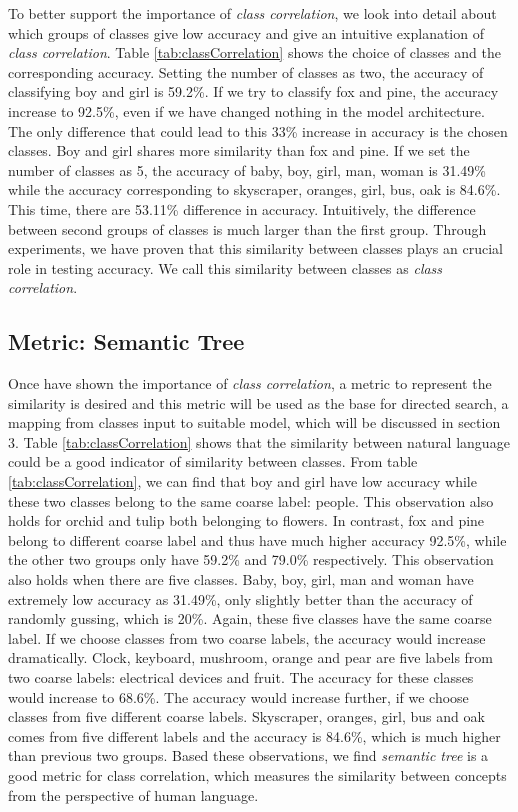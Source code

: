 \documentclass[conference]{IEEEtran}
\begin{document}
\begin{spacing}{0.9}
To better support the importance of \textit{class correlation}, we look into detail about which groups of classes give low accuracy and give an intuitive explanation of \textit{class correlation}. Table \ref{tab:classCorrelation} shows the choice of classes and the corresponding accuracy. Setting the number of classes as two, the accuracy of classifying boy and girl is 59.2\%. If we try to classify fox and pine, the accuracy increase to 92.5\%, even if we have changed nothing in the model architecture. The only difference that could lead to this 33\% increase in accuracy is the chosen classes. Boy and girl shares more similarity than fox and pine. If we set the number of classes as 5, the accuracy of baby, boy, girl, man, woman is 31.49\% while the accuracy corresponding to skyscraper, oranges, girl, bus, oak is 84.6\%. This time, there are 53.11\% difference in accuracy. Intuitively, the difference between second groups of classes is much larger than the first group. Through experiments, we have proven that this similarity between classes plays an crucial role in testing accuracy. We call this similarity between classes as \textit{class correlation}.

\subsection{Metric: Semantic Tree}
Once have shown the importance of \textit{class correlation}, a metric to represent the similarity is desired and this metric will be used as the base for directed search, a mapping from classes input to suitable model, which will be discussed in section 3. Table \ref{tab:classCorrelation} shows that the similarity between natural language could be a good indicator of similarity between classes. From table \ref{tab:classCorrelation}, we can find that boy and girl have low accuracy while these two classes belong to the same coarse label: people. This observation also holds for orchid and tulip both belonging to flowers. In contrast, fox and pine belong to different coarse label and thus have much higher accuracy 92.5\%, while the other two groups only have 59.2\% and 79.0\% respectively. This observation also holds when there are five classes. Baby, boy, girl, man and woman have extremely low accuracy as 31.49\%, only slightly better than the accuracy of randomly gussing, which is 20\%. Again, these five classes have the same coarse label. If we choose classes from two coarse labels, the accuracy would increase dramatically. Clock, keyboard, mushroom, orange and pear are five labels from two coarse labels: electrical devices and fruit. The accuracy for these classes would increase to 68.6\%. The accuracy would increase further, if we choose classes from five different coarse labels. Skyscraper, oranges, girl, bus and oak comes from five different labels and the accuracy is 84.6\%, which is much higher than previous two groups. Based these observations, we find \textit{semantic tree} is a good metric for class correlation, which measures the similarity between concepts from the perspective of human language.


\end{spacing}
\end{document}
